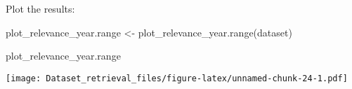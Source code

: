 \documentclass[
]{article}
\newenvironment{Shaded}{\begin{snugshade}}{\end{snugshade}}
\newcommand{\FunctionTok}[1]{\textcolor[rgb]{0.00,0.00,0.00}{#1}}
\newcommand{\NormalTok}[1]{#1}
\newcommand{\OtherTok}[1]{\textcolor[rgb]{0.56,0.35,0.01}{#1}}
\begin{document}
Plot the results:

\begin{Shaded}
\begin{Highlighting}[]
\NormalTok{plot\_relevance\_year.range }\OtherTok{\textless{}{-}} \FunctionTok{plot\_relevance\_year.range}\NormalTok{(dataset)}

\NormalTok{plot\_relevance\_year.range}
\end{Highlighting}
\end{Shaded}

\texttt{[image: Dataset\_retrieval\_files/figure-latex/unnamed-chunk-24-1.pdf]}
\end{document}
